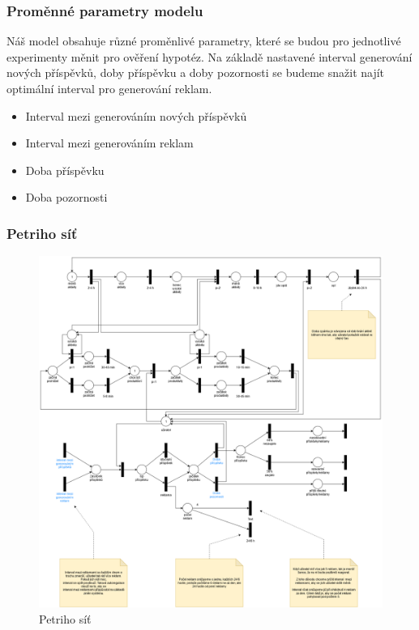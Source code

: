 \documentclass[11pt, a4paper]{article}
\begin{document}
\subsubsection{Proměnné parametry modelu}
Náš model obsahuje různé proměnlivé parametry, které se budou pro jednotlivé experimenty měnit pro ověření hypotéz.
Na základě nastavené interval generování nových příspěvků, doby příspěvku a doby pozornosti se budeme snažit najít optimální interval pro generování reklam.
\begin{itemize}
    \item Interval mezi generováním nových příspěvků
    \item Interval mezi generováním reklam
    \item Doba příspěvku
    \item Doba pozornosti
\end{itemize}

\newpage
\subsubsection{Petriho síť}
\begin{figure}[h]
    \centering
   \includegraphics[width=\linewidth]{petri-net.png}
    \caption{Petriho síť}
\end{figure}
\newpage
\end{document}
